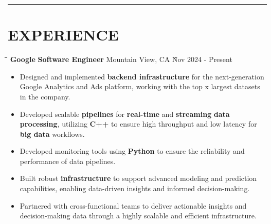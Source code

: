 \documentclass{res}
\begin{document}
\begin{resume}
\vspace{-8pt}
\hspace{-0.55in}
\noindent\rule[0.25\baselineskip]{19.36cm}{0.5pt}    

\vspace{-0.2in}
\section{EXPERIENCE}
    \vspace{0.00in}	
    \begin{tabbing}
    \hspace{1.5in}\= \hspace{2in}\= \hspace{1.6in}\= \kill %
    {\bf Google} \> {\bf Software Engineer}  \>  
                                    Mountain View, CA    \` Nov 2024 - Present\\
    \end{tabbing}\vspace{-20pt}      %
    \vspace{+0.1in}
    \begin{itemize} \itemsep 1.5pt %
    \item Designed and implemented {\bf backend infrastructure} for the next-generation Google Analytics and Ads 
        platform, working with the top x largest datasets in the company.
    \item Developed scalable {\bf pipelines} for {\bf real-time} and {\bf streaming} {\bf data processing}, 
        utilizing {\bf C++} to ensure high throughput and low latency for {\bf big data} workflows.
    \item Developed monitoring tools using {\bf Python} to ensure the reliability and performance of data pipelines.
    \item Built robust {\bf infrastructure} to support advanced modeling and prediction capabilities, 
        enabling data-driven insights and informed decision-making.
    \item Partnered with cross-functional teams to deliver actionable insights and decision-making data through 
        a highly scalable and efficient infrastructure.
    \end{itemize}



\end{resume}
\end{document}
